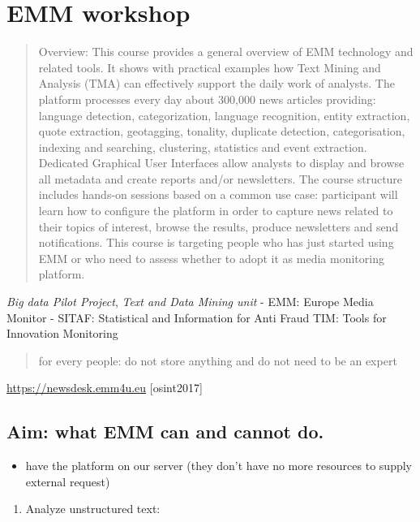 \documentclass[]{book}
\providecommand{\tightlist}{%
  \setlength{\itemsep}{0pt}\setlength{\parskip}{0pt}}
\theoremstyle{definition}
\theoremstyle{definition}
\theoremstyle{definition}
\theoremstyle{remark}
\begin{document}
\chapter{EMM workshop}\label{emm-workshop}

\begin{quote}
Overview: This course provides a general overview of EMM technology and
related tools. It shows with practical examples how Text Mining and
Analysis (TMA) can effectively support the daily work of analysts. The
platform processes every day about 300,000 news articles providing:
language detection, categorization, language recognition, entity
extraction, quote extraction, geotagging, tonality, duplicate detection,
categorisation, indexing and searching, clustering, statistics and event
extraction. Dedicated Graphical User Interfaces allow analysts to
display and browse all metadata and create reports and/or newsletters.
The course structure includes hands-on sessions based on a common use
case: participant will learn how to configure the platform in order to
capture news related to their topics of interest, browse the results,
produce newsletters and send notifications. This course is targeting
people who has just started using EMM or who need to assess whether to
adopt it as media monitoring platform.
\end{quote}

\emph{Big data Pilot Project}, \emph{Text and Data Mining unit} - EMM:
Europe Media Monitor - SITAF: Statistical and Information for Anti Fraud
TIM: Tools for Innovation Monitoring

\begin{quote}
for every people: do not store anything and do not need to be an expert
\end{quote}

\url{https://newsdesk.emm4u.eu} {[}osint2017{]}

\section{Aim: what EMM can and cannot
do.}\label{aim-what-emm-can-and-cannot-do.}

\begin{itemize}
\tightlist
\item
  have the platform on our server (they don't have no more resources to
  supply external request)
\end{itemize}

\begin{enumerate}
\def\labelenumi{\arabic{enumi}.}
\tightlist
\item
  Analyze unstructured text:
\end{enumerate}
\end{document}
